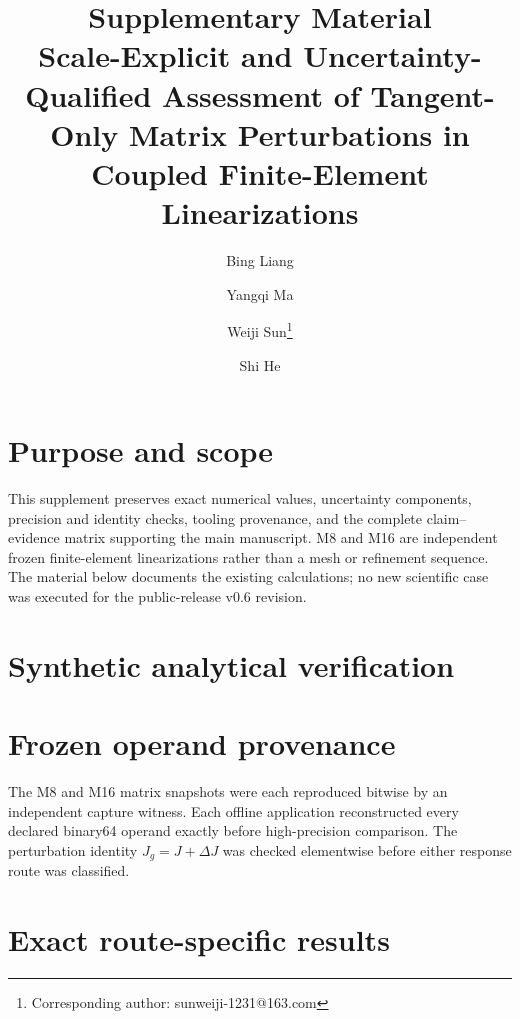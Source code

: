 \documentclass[11pt]{article}
\title{\bfseries Supplementary Material\\[0.4em]\large Scale-Explicit and Uncertainty-Qualified Assessment of Tangent-Only Matrix Perturbations in Coupled Finite-Element Linearizations}
\author{Bing Liang \and Yangqi Ma \and Weiji Sun\thanks{Corresponding author: sunweiji-1231@163.com} \and Shi He}
\date{}
\begin{document}
\maketitle
\renewcommand{\thetable}{S\arabic{table}}
\renewcommand{\thefigure}{S\arabic{figure}}

\section*{Purpose and scope}
This supplement preserves exact numerical values, uncertainty components, precision and identity checks, tooling provenance, and the complete claim--evidence matrix supporting the main manuscript. M8 and M16 are independent frozen finite-element linearizations rather than a mesh or refinement sequence. The material below documents the existing calculations; no new scientific case was executed for the public-release v0.6 revision.

\section{Synthetic analytical verification}
\begin{table}[htbp]\centering\small
\caption{Pre-specified reproduction of the P2 directional construction.}\label{tab:S1}

\end{table}

\begin{table}[htbp]\centering\small
\caption{Pre-specified P3 coordinate-transformation and redeclaration calculation.}\label{tab:S2}

\end{table}

\section{Frozen operand provenance}


The M8 and M16 matrix snapshots were each reproduced bitwise by an independent capture witness. Each offline application reconstructed every declared binary64 operand exactly before high-precision comparison. The perturbation identity $J_g=J+\Delta J$ was checked elementwise before either response route was classified.

\section{Exact route-specific results}
\footnotesize
\setlength{\tabcolsep}{3.5pt}

\normalsize
\end{document}
